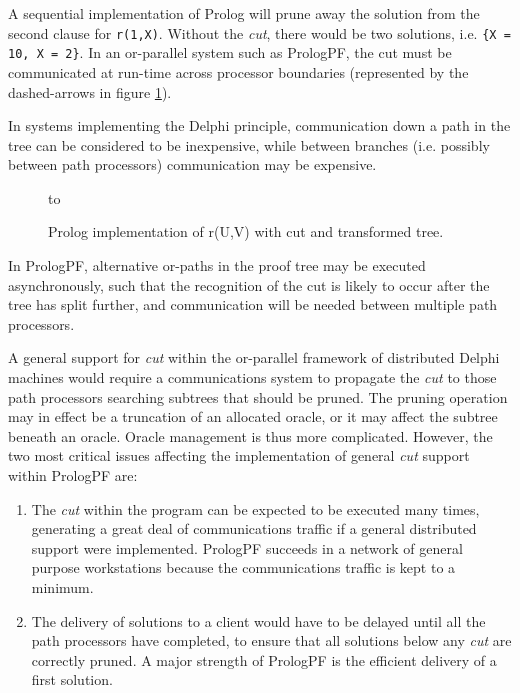 A sequential implementation of Prolog will prune away
the solution from the second clause
for \texttt{r(1,X)}.  Without the \textit{cut}, there would be two solutions, i.e.
\texttt{\{X = 10, X = 2\}}.
  In an or-parallel system such as PrologPF, the cut must be
communicated at run-time
across processor boundaries (represented by the dashed-arrows in
figure \ref{cut_tree}).

In systems implementing the Delphi principle, communication down
a path in the tree can be considered to be inexpensive, while between branches
(i.e. possibly between path processors) communication may be expensive.

\begin{figure}[h]
\vspace{5mm} \hbox to 
\caption{Prolog implementation of r(U,V) with cut and transformed tree.}
\vspace{5mm}
\label{cut_tree}
\end{figure}

In PrologPF, alternative or-paths in the proof tree may be executed asynchronously, such
that the recognition of the cut is likely to occur after the tree has split further, and
communication will be needed between multiple path processors.

A general support for \textit{cut} within the or-parallel framework of distributed
Delphi machines would require a communications system to propagate the \textit{cut} to
those path processors searching subtrees that should be pruned.
The pruning operation may in effect be a truncation
of an allocated oracle,
or it may affect the subtree beneath an oracle.  Oracle management is thus more complicated.
However, the two most critical issues affecting the implementation of general \textit{cut}
support within PrologPF are:
\begin{enumerate}
\item{The \textit{cut} within the program can be expected to be executed many times,
  generating a great deal of communications traffic if a general distributed support were
  implemented.  PrologPF succeeds in a network of general purpose workstations because
  the communications traffic is kept to a minimum.}
\item{The delivery of solutions to a client would have to be delayed until all the
  path processors have completed, to ensure that all solutions below any \textit{cut}
  are correctly pruned.  A major strength of PrologPF is the efficient delivery
  of a first solution.}
\end{enumerate}



